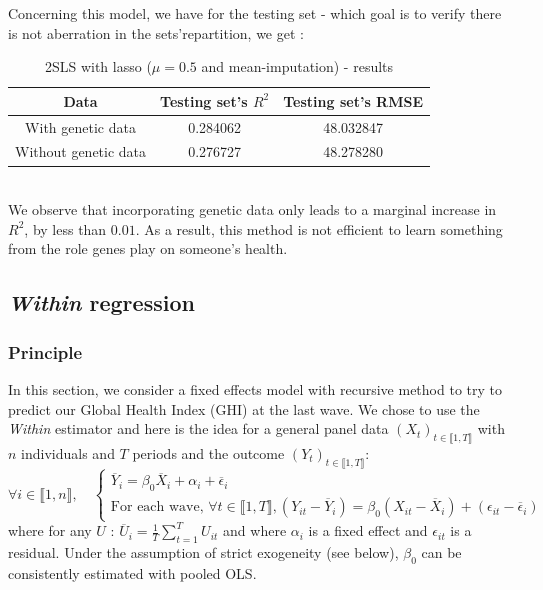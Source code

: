 \documentclass[]{article}
\begin{document}
\noindent
Concerning this model, we have for the testing set - which goal is to verify there is not aberration in the sets'repartition, we get : 
\begin{table}[!h]
	\centering
	\begin{tabular}{|c|c|c|}
		\hline
		\textbf{Data} & \textbf{Testing set's $R^2$} & \textbf{Testing set's RMSE} \\
		\hline
		With genetic data & 0.284062 & 48.032847  \\ 
		\hline
		Without genetic data & 0.276727 & 48.278280 \\
		\hline 
	\end{tabular}
	\caption{2SLS with lasso ($\mu = 0.5$ and mean-imputation) - results}
	\label{results_2SLS}
\end{table}\\
We observe that incorporating genetic data only leads to a marginal increase in $R^2$, by less than $0.01$. As a result, this method is not efficient to learn something from the role genes play on someone's health.

\subsection{\textit{Within} regression}

\subsubsection{Principle}
In this section, we consider a fixed effects model with recursive method to try to predict our Global Health Index (GHI) at the last wave. We chose to use the \textit{Within} estimator and here is the idea for a general panel data $(X_t)_{t\in \llbracket1,T\rrbracket}$ with $n$ individuals and $T$ periods and the outcome $(Y_t)_{t\in \llbracket1,T\rrbracket}$:
\begin{equation}
	\forall i \in \llbracket1,n\rrbracket,\quad \left\{
	\begin{array}{ll}
		\overline{Y}_i = \beta_0 \overline{X}_i + \alpha_i + \overline{\epsilon}_i \\
		\text{For each wave, } \forall t \in \llbracket1,T\rrbracket , (Y_{it} -\overline{Y}_i )= \beta_0 ( X_{it} - \overline{X}_i) + (\epsilon_{it} - \overline{\epsilon}_i )
	\end{array}
	\right.
\end{equation}
where for any $U$ : $\overline{U}_i = \frac{1}{T} \sum_{t=1}^T U_{it}$ and where $\alpha_i$ is a fixed effect and $\epsilon_{it}$ is a residual. Under the assumption of strict exogeneity (see below), $\beta_0$ can be consistently estimated with pooled OLS.\\
\end{document}
